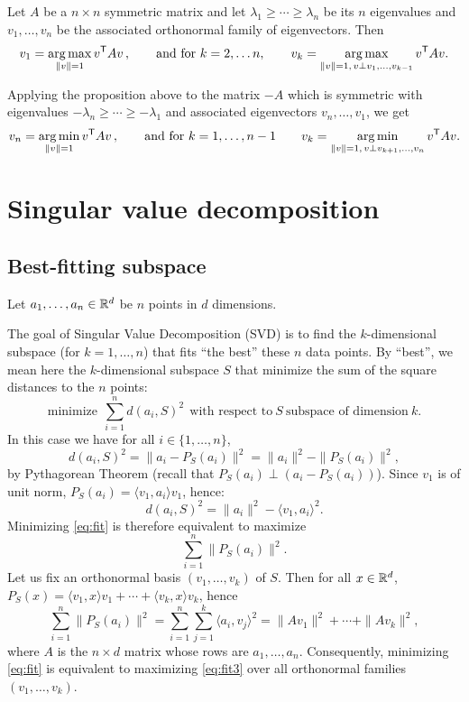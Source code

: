 \documentclass[11pt,nocut]{article}
\begin{document}
\begin{proposition}
	Let $A$ be a $n \times n$ symmetric matrix and let $\lambda_1 \geq \cdots \geq \lambda_n$ be its $n$ eigenvalues and $v_1, \dots, v_n$ be the associated orthonormal family of eigenvectors. Then 
	$$
	v_1 = \operatorname*{arg\,max}_{\|v\| = 1} v^{{\sf T}} A v\,,
	\qquad \text{and for} \ k=2, \dots n, \qquad
	v_{k} = \operatorname*{arg\,max}_{\|v\| = 1, \, v \perp v_1, \dots, v_{k-1}} v^{{\sf T}} A v.
	$$
\end{proposition}

\begin{remark} Applying the proposition above to the matrix $-A$ which is symmetric with eigenvalues $-\lambda_n \geq \cdots \geq -\lambda_1$ and associated eigenvectors $v_n, \dots, v_1$, we get
	$$
	v_n = \operatorname*{arg\,min}_{\|v\| = 1} v^{{\sf T}} A v\,,
	\qquad \text{and for} \ k=1, \dots , n-1 \qquad
	v_{k} = \operatorname*{arg\,min}_{\|v\| = 1, \, v \perp v_{k+1}, \dots, v_{n}} v^{{\sf T}} A v.
	$$
\end{remark}


\section{Singular value decomposition}

\subsection{Best-fitting subspace}
Let $a_1, \dots, a_n \in \mathbb{R}^d$ be $n$ points in $d$ dimensions.

The goal of Singular Value Decomposition (SVD) is to find the $k$-dimensional subspace (for $k = 1, \dots, n$) that fits ``the best'' these $n$ data points. By ``best'', we mean here the $k$-dimensional subspace $S$ that minimize the sum of the square distances to the $n$ points:
\begin{equation}\label{eq:fit}
	\text{minimize} \ \ \sum_{i=1}^n d(a_i, S)^2 \ \ \text{with respect to} \ S \ \text{subspace of dimension} \ k.
\end{equation}
In this case we have for all $i \in \{1, \dots, n\}$,
$$
d(a_i, S)^2 = \| a_i - P_{S}(a_i) \|^2 = \|a_i\|^2 - \| P_{S}(a_i) \|^2,
$$
by Pythagorean Theorem (recall that $P_{S}(a_i) \perp (a_i - P_S(a_i))$). Since $v_1$ is of unit norm, $P_{S}(a_i) = \langle v_1, a_i \rangle v_1$, hence:
$$
d(a_i, S)^2 =  \|a_i\|^2 - \langle v_1, a_i \rangle^2.
$$
Minimizing \eqref{eq:fit} is therefore equivalent to maximize
\begin{equation}\label{eq:fit2}
\sum_{i=1}^n \| P_{S}(a_i) \|^2.
\end{equation}
Let us fix an orthonormal basis $(v_1, \dots, v_k)$ of $S$. Then for all $x \in \mathbb{R}^d$,
$P_S(x)= \langle v_1, x \rangle v_1 + \cdots + \langle v_k, x \rangle v_k$, hence
\begin{equation}\label{eq:fit3}
\sum_{i=1}^n \| P_{S}(a_i) \|^2 = \sum_{i=1}^n \sum_{j = 1}^k \langle a_i, v_j \rangle^2
= \| A v_1 \|^2 + \cdots + \| A v_k \|^2,
\end{equation}
where $A$ is the $n \times d$ matrix whose rows are $a_1, \dots, a_n$.
Consequently, minimizing \eqref{eq:fit} is equivalent to maximizing \eqref{eq:fit3} over all orthonormal families $(v_1, \dots, v_k)$.
\\
\end{document}
